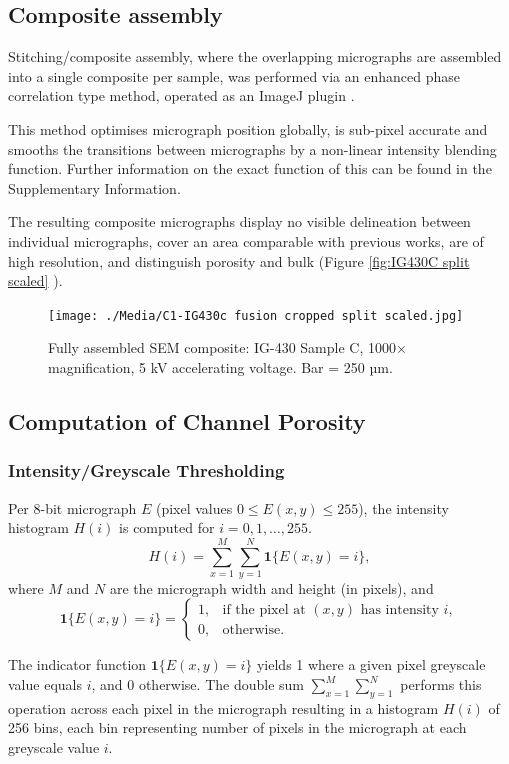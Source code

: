 \documentclass[review]{elsarticle}
\begin{document}
\subsection{Composite assembly}
Stitching/composite assembly, where the overlapping micrographs are assembled
into a single composite per sample, was performed via an enhanced phase
correlation type method, operated as an ImageJ plugin \citep{ Preibisch2009}.

This method optimises micrograph position globally, is sub-pixel accurate and
smooths the transitions between micrographs by a non-linear intensity blending
function. Further information on the exact function of this can be found in the
Supplementary Information.

The resulting composite micrographs display no visible delineation between
individual micrographs, cover an area comparable with previous works, are of
high resolution, and distinguish porosity and bulk (Figure \ref{fig:IG430C split
scaled} \citep{Huang2019,Kane2011a}). 

	\begin{figure}
		\centering
		\texttt{[image: ./Media/C1-IG430c fusion cropped split scaled.jpg]}
		\caption{Fully assembled SEM composite: IG-430 Sample C, 1000×  magnification,
     5 kV accelerating voltage. Bar = 250 µm.}
		\label{fig:IG430C split scaled}
	\end{figure} 

	\subsection{Computation of Channel Porosity}
\subsubsection{Intensity/Greyscale Thresholding}

Per 8-bit micrograph \(E\) (pixel values \(0 \le E(x,y) \le 255\)), the
intensity histogram \(H(i)\) is computed for \(i=0,1,\dots,255\).
\[
H(i) = \sum_{x=1}^{M}\sum_{y=1}^{N} \mathbf{1}\{E(x,y)=i\},
\]
where \(M\) and \(N\) are the micrograph width and height (in pixels), and
\[
\mathbf{1}\{E(x,y)=i\} =
\begin{cases}
1, & \text{if the pixel at }(x,y)\text{ has intensity }i,\\
0, & \text{otherwise.}
\end{cases}
\]

The indicator function \(\mathbf{1}\{E(x,y)=i\}\) yields 1 where a given pixel
greyscale value equals \(i\), and 0 otherwise. The double sum
\(\sum_{x=1}^M\sum_{y=1}^N\) performs this operation across each pixel in the
micrograph resulting in a histogram \(H(i)\) of 256 bins, each bin representing
number of pixels in the micrograph at each greyscale value \(i\). 
\end{document}
